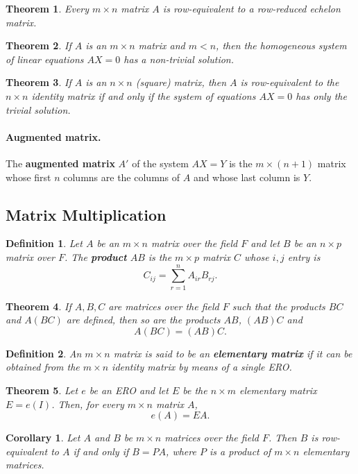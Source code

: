 \documentclass{article}
\newtheorem{theorem}{Theorem}
\newtheorem*{definition*}{Definition}
\newtheorem*{corollary*}{Corollary}
\begin{document}
\begin{theorem}
  Every $m \times n$ matrix $A$ is row-equivalent to a row-reduced echelon
  matrix.
\end{theorem}

\begin{theorem}
  If $A$ is an $m \times n$ matrix and $m < n$, then the homogeneous system of
  linear equations $AX = 0$ has a non-trivial solution.
\end{theorem}

\begin{theorem}
  If $A$ is an $n \times n$ (square) matrix, then $A$ is row-equivalent to the
  $n \times n$ identity matrix if and only if the system of equations $AX = 0$
  has only the trivial solution.
\end{theorem}

\paragraph{Augmented matrix.} The \textbf{augmented matrix} $A'$ of the system
$AX = Y$ is the $m \times (n + 1)$ matrix whose first $n$ columns are the
columns of $A$ and whose last column is $Y$.

\subsection{Matrix Multiplication}

\begin{definition*}
  Let $A$ be an $m \times n$ matrix over the field $F$ and let $B$ be an $n
  \times p$ matrix over $F$. The \textbf{product} $AB$ is the $m \times p$
  matrix $C$ whose $i, j$ entry is \[
    C_{ij} = \sum_{r=1}^n A_{ir}B_{rj}.
  \]
\end{definition*}

\begin{theorem}
  If $A, B, C$ are matrices over the field $F$ such that the products $BC$ and
  $A(BC)$ are defined, then so are the products $AB$, $(AB)C$ and \[
    A(BC) = (AB)C.
  \]
\end{theorem}

\begin{definition*}
  An $m \times n$ matrix is said to be an \textbf{elementary matrix} if it can
  be obtained from the $m \times n$ identity matrix by means of a single ERO.
\end{definition*}

\begin{theorem}
  Let $e$ be an ERO and let $E$ be the $n \times m$ elementary matrix $E =
  e(I)$. Then, for every $m \times n$ matrix $A$, \[
    e(A) = EA.
  \]
\end{theorem}

\begin{corollary*}
  Let $A$ and $B$ be $m \times n$ matrices over the field $F$. Then $B$ is
  row-equivalent to $A$ if and only if $B = PA$, where $P$ is a product of $m
  \times n$ elementary matrices.
\end{corollary*}
\end{document}
